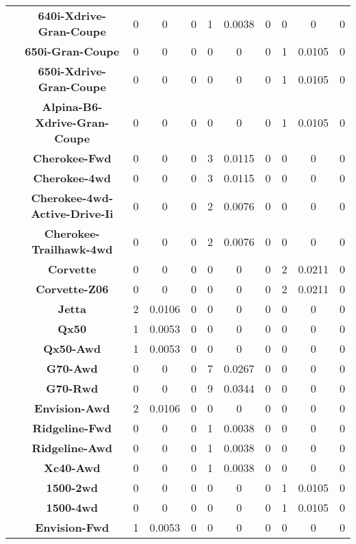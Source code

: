 \begin{center}
\begin{tabular}{|c|c||@{\hspace{1ex}}||c|c|c||@{\hspace{1ex}}||c|c|c||@{\hspace{1ex}}||c|c|c||@{\hspace{1ex}}||}
\cline{2-11}
  & {\bf 640i-Xdrive-Gran-Coupe} & 0 & 0 & 0 & 1 & 0.0038 & 0 & 0 & 0 & 0 \\
\cline{2-11}
  & {\bf 650i-Gran-Coupe} & 0 & 0 & 0 & 0 & 0 & 0 & 1 & 0.0105 & 0 \\
\cline{2-11}
  & {\bf 650i-Xdrive-Gran-Coupe} & 0 & 0 & 0 & 0 & 0 & 0 & 1 & 0.0105 & 0 \\
\cline{2-11}
  & {\bf Alpina-B6-Xdrive-Gran-Coupe} & 0 & 0 & 0 & 0 & 0 & 0 & 1 & 0.0105 & 0 \\
\cline{2-11}
  & {\bf Cherokee-Fwd} & 0 & 0 & 0 & 3 & 0.0115 & 0 & 0 & 0 & 0 \\
\cline{2-11}
  & {\bf Cherokee-4wd} & 0 & 0 & 0 & 3 & 0.0115 & 0 & 0 & 0 & 0 \\
\cline{2-11}
  & {\bf Cherokee-4wd-Active-Drive-Ii} & 0 & 0 & 0 & 2 & 0.0076 & 0 & 0 & 0 & 0 \\
\cline{2-11}
  & {\bf Cherokee-Trailhawk-4wd} & 0 & 0 & 0 & 2 & 0.0076 & 0 & 0 & 0 & 0 \\
\cline{2-11}
  & {\bf Corvette} & 0 & 0 & 0 & 0 & 0 & 0 & 2 & 0.0211 & 0 \\
\cline{2-11}
  & {\bf Corvette-Z06} & 0 & 0 & 0 & 0 & 0 & 0 & 2 & 0.0211 & 0 \\
\cline{2-11}
  & {\bf Jetta} & 2 & 0.0106 & 0 & 0 & 0 & 0 & 0 & 0 & 0 \\
\cline{2-11}
  & {\bf Qx50} & 1 & 0.0053 & 0 & 0 & 0 & 0 & 0 & 0 & 0 \\
\cline{2-11}
  & {\bf Qx50-Awd} & 1 & 0.0053 & 0 & 0 & 0 & 0 & 0 & 0 & 0 \\
\cline{2-11}
  & {\bf G70-Awd} & 0 & 0 & 0 & 7 & 0.0267 & 0 & 0 & 0 & 0 \\
\cline{2-11}
  & {\bf G70-Rwd} & 0 & 0 & 0 & 9 & 0.0344 & 0 & 0 & 0 & 0 \\
\cline{2-11}
  & {\bf Envision-Awd} & 2 & 0.0106 & 0 & 0 & 0 & 0 & 0 & 0 & 0 \\
\cline{2-11}
  & {\bf Ridgeline-Fwd} & 0 & 0 & 0 & 1 & 0.0038 & 0 & 0 & 0 & 0 \\
\cline{2-11}
  & {\bf Ridgeline-Awd} & 0 & 0 & 0 & 1 & 0.0038 & 0 & 0 & 0 & 0 \\
\cline{2-11}
  & {\bf Xc40-Awd} & 0 & 0 & 0 & 1 & 0.0038 & 0 & 0 & 0 & 0 \\
\cline{2-11}
  & {\bf 1500-2wd} & 0 & 0 & 0 & 0 & 0 & 0 & 1 & 0.0105 & 0 \\
\cline{2-11}
  & {\bf 1500-4wd} & 0 & 0 & 0 & 0 & 0 & 0 & 1 & 0.0105 & 0 \\
\cline{2-11}
  & {\bf Envision-Fwd} & 1 & 0.0053 & 0 & 0 & 0 & 0 & 0 & 0 & 0 \\

\end{tabular}
\end{center}
